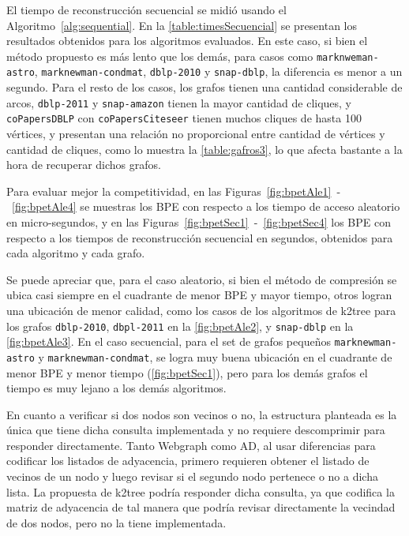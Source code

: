 

El tiempo de reconstrucción secuencial se midió usando el Algoritmo~\ref{alg:sequential}. En la \autoref{table:timesSecuencial} se presentan los resultados obtenidos para los algoritmos evaluados. En este caso, si bien el método propuesto es más lento que los demás, para casos como \texttt{marknweman-astro}, \texttt{marknewman-condmat}, \texttt{dblp-2010} y \texttt{snap-dblp}, la diferencia es menor a un segundo. Para el resto de los casos, los grafos tienen una cantidad considerable de arcos, \texttt{dblp-2011} y \texttt{snap-amazon} tienen la mayor cantidad de cliques, y \texttt{coPapersDBLP} con \texttt{coPapersCiteseer} tienen muchos cliques de hasta 100 vértices, y presentan una relación no proporcional entre cantidad de vértices y cantidad de cliques, como lo muestra la \autoref{table:gafros3}, lo que afecta bastante a la hora de recuperar dichos grafos.

Para evaluar mejor la competitividad, en las Figuras~\ref{fig:bpetAle1}~-~\ref{fig:bpetAle4} se muestras los BPE con respecto a los tiempo de acceso aleatorio en micro-segundos, y en las Figuras~\ref{fig:bpetSec1}~-~\ref{fig:bpetSec4} los BPE con respecto a los tiempos de reconstrucción secuencial en segundos, obtenidos para cada algoritmo y cada grafo.

Se puede apreciar que, para el caso aleatorio, si bien el método de compresión se ubica casi siempre en el cuadrante de menor BPE y mayor tiempo, otros logran una ubicación de menor calidad, como los casos de los algoritmos de k2tree para los grafos \texttt{dblp-2010}, \texttt{dbpl-2011} en la \autoref{fig:bpetAle2}, y \texttt{snap-dblp} en la \autoref{fig:bpetAle3}. En el caso secuencial, para el set de grafos pequeños \texttt{marknewman-astro} y \texttt{marknewman-condmat}, se logra muy buena ubicación en el cuadrante de menor BPE y menor tiempo (\autoref{fig:bpetSec1}), pero para los demás grafos el tiempo es muy lejano a los demás algoritmos. 

En cuanto a verificar si dos nodos son vecinos o no, la estructura planteada es la única que tiene dicha consulta implementada y no requiere descomprimir para responder directamente. Tanto Webgraph como AD, al usar diferencias para codificar los listados de adyacencia, primero requieren obtener el listado de vecinos de un nodo y luego revisar si el segundo nodo pertenece o no a dicha lista. La propuesta de k2tree podría responder dicha consulta, ya que codifica la matriz de adyacencia de tal manera que podría revisar directamente la vecindad de dos nodos, pero no la tiene implementada.

 











